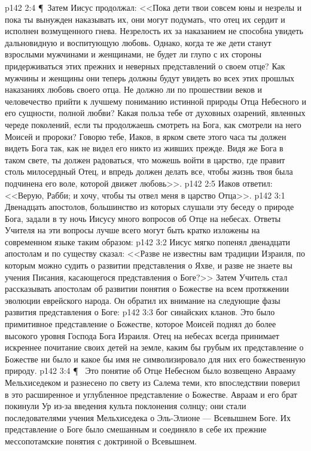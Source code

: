 \vs p142 2:4 \P\ Затем Иисус продолжал: <<Пока дети твои совсем юны и незрелы и пока ты вынужден наказывать их, они могут подумать, что отец их сердит и исполнен возмущенного гнева. Незрелость их за наказанием не способна увидеть дальновидную и воспитующую любовь. Однако, когда те же дети станут взрослыми мужчинами и женщинами, не будет ли глупо с их стороны придерживаться этих прежних и неверных представлений о своем отце? Как мужчины и женщины они теперь должны будут увидеть во всех этих прошлых наказаниях любовь своего отца. Не должно ли по прошествии веков и человечество прийти к лучшему пониманию истинной природы Отца Небесного и его сущности, полной любви? Какая польза тебе от духовных озарений, явленных череде поколений, если ты продолжаешь смотреть на Бога, как смотрели на него Моисей и пророки? Говорю тебе, Иаков, в ярком свете этого часа ты должен видеть Бога так, как не видел его никто из живших прежде. Видя же Бога в таком свете, ты должен радоваться, что можешь войти в царство, где правит столь милосердный Отец, и впредь должен делать все, чтобы жизнь твоя была подчинена его воле, которой движет любовь>>.
\vs p142 2:5 Иаков ответил: <<Верую, Рабби; и хочу, чтобы ты отвел меня в царство Отца>>.
\vs p142 3:1 Двенадцать апостолов, большинство из которых слушали эту беседу о природе Бога, задали в ту ночь Иисусу много вопросов об Отце на небесах. Ответы Учителя на эти вопросы лучше всего могут быть кратко изложены на современном языке таким образом:
\vs p142 3:2 Иисус мягко попенял двенадцати апостолам и по существу сказал: <<Разве не известны вам традиции Израиля, по которым можно судить о развитии представления о Яхве, и разве не знаете вы учения Писания, касающегося представления о Боге?>> Затем Учитель стал рассказывать апостолам об развитии понятия о Божестве на всем протяжении эволюции еврейского народа. Он обратил их внимание на следующие фазы развития представления о Боге:
\vs p142 3:3  бог синайских кланов. Это было примитивное представление о Божестве, которое Моисей поднял до более высокого уровня Господа Бога Израиля. Отец на небесах всегда принимает искреннее почитание своих детей на земле, каким бы грубым их представление о Божестве ни было и какое бы имя не символизировало для них его божественную природу.
\vs p142 3:4 \P\ \bibnobreakspace {} Это понятие об Отце Небесном было возвещено Аврааму Мельхиседеком и разнесено по свету из Салема теми, кто впоследствии поверил в это расширенное и углубленное представление о Божестве. Авраам и его брат покинули Ур из\hyp{}за введения культа поклонения солнцу; они стали последователями учения Мельхиседека о Эль\hyp{}Элионе --- Всевышнем Боге. Их представление о Боге было смешанным и соединяло в себе их прежние мессопотамские понятия с доктриной о Всевышнем.
